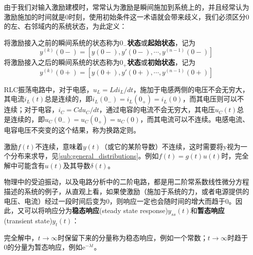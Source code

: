 \documentclass{ctexbook}
\begin{document}
由于我们对输入激励建模时，常常认为激励是瞬间施加到系统上的，并且经常认为激励施加的时间就是0时刻，使用初始条件这一术语就会带来歧义，我们必须区分0的左、右邻域内的系统状态，为此定义\cite{signal_systems}：
\begin{definition}[起始状态和初始状态]
    将激励接入之前的瞬间系统的状态称为\textbf{$0_-$状态}或\textbf{起始状态}，记为
    \[y^{(k)}(0-)=[y(0-),y'(0-),\cdots,y^{(n-1)}(0-)]\]
    将激励接入之后的瞬间系统的状态称为\textbf{$0_+$状态}或\textbf{初始状态}，记为
    \[y^{(k)}(0+)=[y(0+),y'(0+),\cdots,y^{(n-1)}(0+)]\]
\end{definition}

\begin{example}[换路定则]
    RLC振荡电路中，对于电感，$u_L=Ldi_L/dt$，施加于电感两侧的电压不会无穷大，其电流$i_L(t)$总是连续的，即$i_L(0_-)=i_L(0_+)=i_L(0)$，而其电压则可以不连续；对于电容，$i_C=Cdu_C/dt$，通过电容的电流不会无穷大，其电压$u_C(t)$总是连续的，即$u_C(0_-)=u_C(0_+)=u_C(0)$，而其电流可以不连续。电感电流、电容电压不突变的这个结果，称为换路定则。
\end{example}

激励$f(t)$不连续，意味着$y(t)$（或它的某阶导数）不连续，这时需要将y视为一个分布来求导，见\ref{sub:general_distributions}。例如$f(t)=g(t)u(t)$时，完全解中可能含有$u(t)$及其导数$\delta(t)$。

物理中的受迫振动，以及电路分析中的二阶电路，都是用二阶常系数线性微分方程描述的系统的例子，从直观上看，如果使激励（施加于系统的力，或者电源提供的电压、电流）经过一段时间后变为0，则响应一定也会随时间的增大而趋于0。因此，又可以将响应分为\textbf{稳态响应}(steady state response)$y_{ss}(t)$和\textbf{暂态响应}(transient state)$y_t(t)$：
\begin{definition}[稳态响应和暂态响应]
完全解中，$t\to\infty$时保留下来的分量称为稳态响应，例如一个常数；$t\to\infty$时趋于0的分量为暂态响应，例如$\mathrm{e}^{-\lambda t}$。
\end{definition}
\end{document}
